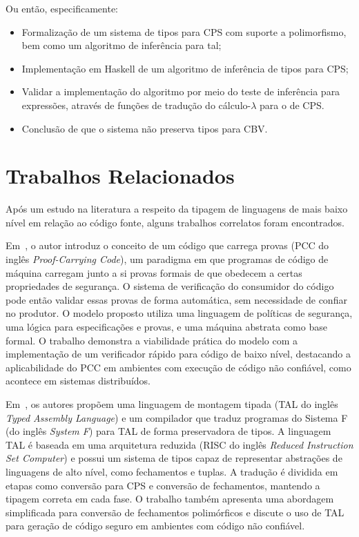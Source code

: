 Ou então, especificamente:
\begin{itemize}
  \item Formalização de um sistema de tipos para CPS com suporte a polimorfismo, bem como um algoritmo de inferência para tal;\@
  \item Implementação em Haskell de um algoritmo de inferência de tipos para CPS;\@
  \item Validar a implementação do algoritmo por meio do teste de inferência para expressões, através de funções de tradução do cálculo-$\lambda$ para o de CPS.\@
  \item Conclusão de que o sistema não preserva tipos para CBV.
\end{itemize}

\section{Trabalhos Relacionados}
Após um estudo na literatura a respeito da tipagem de linguagens de mais baixo nível em relação ao código fonte, alguns trabalhos correlatos foram encontrados.

Em~\cite{necula1997pcc}, o autor introduz o conceito de um código que carrega provas (PCC do inglês \textit{Proof-Carrying Code}), um paradigma em que programas de código de máquina carregam junto a si provas formais de que obedecem a certas propriedades de segurança.
O sistema de verificação do consumidor do código pode então validar essas provas de forma automática, sem necessidade de confiar no produtor.
O modelo proposto utiliza uma linguagem de políticas de segurança, uma lógica para especificações e provas, e uma máquina abstrata como base formal.
O trabalho demonstra a viabilidade prática do modelo com a implementação de um verificador rápido para código de baixo nível, destacando a aplicabilidade do PCC em ambientes com execução de código não confiável, como acontece em sistemas distribuídos.

Em~\cite{morrisett1999systemF}, os autores propõem uma linguagem de montagem tipada (TAL do inglês \textit{Typed Assembly Language}) e um compilador que traduz programas do Sistema F (do inglês \textit{System F}) para TAL de forma preservadora de tipos.
A linguagem TAL é baseada em uma arquitetura reduzida (RISC do inglês \textit{Reduced Instruction Set Computer}) e possui um sistema de tipos capaz de representar abstrações de linguagens de alto nível, como fechamentos e tuplas.
A tradução é dividida em etapas como conversão para CPS e conversão de fechamentos, mantendo a tipagem correta em cada fase.
O trabalho também apresenta uma abordagem simplificada para conversão de fechamentos polimórficos e discute o uso de TAL para geração de código seguro em ambientes com código não confiável.

